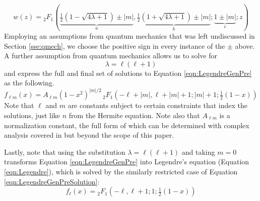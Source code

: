 \documentclass[titlepage]{article}
\numberwithin{equation}{section}
\begin{document}
\begin{equation*}
    w(z) = {}_2F_1(\underbrace{\tfrac{1}{2}(1-\sqrt{4\lambda+1})\pm|m|}_a,\underbrace{\tfrac{1}{2}(1+\sqrt{4\lambda+1})\pm|m|}_b;\underbrace{1\pm|m|}_c;z)
\end{equation*}
Employing an assumptions from quantum mechanics that was left undiscussed in Section \ref{sse:qmech}, we choose the positive sign in every instance of the $\pm$ above. A further assumption from quantum mechanics allows us to solve for
\begin{equation*}
    \lambda = \ell(\ell+1)\tag{$\ell=0,1,2,\dots$}
\end{equation*}
and express the full and final set of solutions to Equation \ref{eqn:LegendreGenPre} as the following.
\begin{equation}\label{eqn:LegendreGenPreSolution}
    f_{\ell m}(x) = A_{\ell m}(1-x^2)^{|m|/2}\,{}_2F_1(-\ell+|m|,\ell+|m|+1;|m|+1;\tfrac{1}{2}(1-x))
\end{equation}
Note that $\ell$ and $m$ are constants subject to certain constraints that index the solutions, just like $n$ from the Hermite equation. Note also that $A_{\ell m}$ is a normalization constant, the full form of which can be determined with complex analysis covered in \textcite{bib:Seaborn} but beyond the scope of this paper.\par
Lastly, note that using the substitution $\lambda=\ell(\ell+1)$ and taking $m=0$ transforms Equation \ref{eqn:LegendreGenPre} into Legendre's equation (Equation \ref{eqn:Legendre}), which is solved by the similarly restricted case of Equation \ref{eqn:LegendreGenPreSolution}:
\begin{equation}\label{eqn:LegendreSolution}
    f_\ell(x) = {}_2F_1(-\ell,\ell+1;1;\tfrac{1}{2}(1-x))
\end{equation}
\newpage
\end{document}

